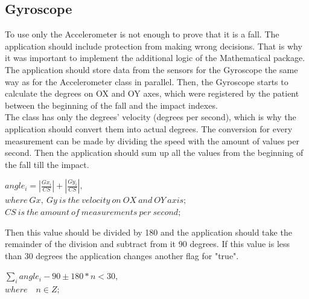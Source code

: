 \documentclass[hidelinks,conference,12pt]{IEEETran}
\begin{document}
\subsection{Gyroscope}
To use only the Accelerometer is not enough to prove that it is a fall. The application should include protection from making wrong decisions. That is why it was important to implement the additional logic of the Mathematical package.\\
The application should store data from the sensors for the Gyroscope the same way as for the Accelerometer class in parallel. Then, the Gyroscope starts to calculate the degrees on OX and OY axes, which were registered by the patient between the beginning of the fall and the impact indexes. \\
The class has only the degrees' velocity (degrees per second), which is why the application should convert them into actual degrees. The conversion for every measurement can be made by dividing the speed with the amount of values per second. Then the application should sum up all the values from the beginning of the fall till the impact.\\
\begin{center}
	$angle_i = \left| \frac{Gx_i}{CS} \right| + \left| \frac{Gy_i}{CS} \right|,$\\
	$where \ Gx,\ Gy\ is\ the\ velocity\ on\ OX\ and\ OY\ axis;$ 
	$CS\ is\ the\ amount\ of\ measurements\ per\ second;$
\end{center}
Then this value should be divided by 180 and the application should take the remainder of the division and subtract from it 90 degrees. If this value is less than 30 degrees the application changes another flag for "true".
\begin{center}
	${\sum}_i angle_i - 90 \pm 180 * n < 30,$ \\
	$where \quad n \in Z; $
\end{center}
\end{document}
